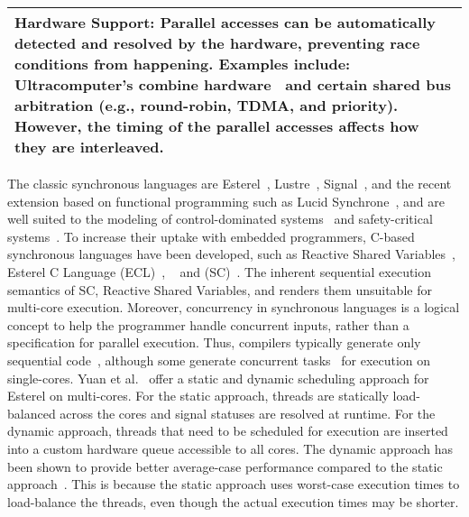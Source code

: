 \begin{table}
{\begin{tabular}{| p{\textwidth} |}
			\textbf{Hardware Support:}
			Parallel accesses can be automatically detected and resolved by the hardware, preventing
			race conditions from happening. Examples include: Ultracomputer's combine hardware~\cite{Schwartz80} 
			and certain shared bus arbitration (e.g., round-robin, TDMA, and priority). However, the 
			timing of the parallel accesses affects how they are interleaved.					\\
			\hline
		\end{tabular}
	}
\end{table}

The classic synchronous languages
are Esterel~\cite{timed_esterel}, Lustre~\cite{timed_lustre}, 
Signal~\cite{timed_signal}, and the recent extension based 
on functional programming such as Lucid Synchrone~\cite{ColacoP03}, 
and are well suited to the modeling 
of control-dominated systems~\cite{CaspiM05} and
safety-critical systems~\cite{timed_synchronous_survey}. 
To increase their uptake with embedded programmers, 
C-based synchronous languages have
been developed, such as Reactive Shared Variables~\cite{timed_reactivec_shared_variables}, 
Esterel C Language (ECL)~\cite{timed_ecl}, \pretc{}~\cite{pret_pretc} and 
\synchronousc{} (SC)~\cite{timed_synccharts_c_proposal,timed_seq_concurrency}. 
The inherent sequential execution semantics of SC, 
Reactive Shared Variables, and \pretc{} renders them 
unsuitable for multi-core execution.
Moreover, concurrency in synchronous languages is a logical concept 
to help the programmer handle concurrent inputs, rather
than a specification for parallel execution.
Thus, compilers typically generate only sequential 
code~\cite{timed_cec,timed_compiling_esterel}, 
although some generate concurrent 
tasks~\cite{CaspiSST08,NataleGZS10,PagettiFBCL11,NataleZ12}
for execution on single-cores. Yuan et al.~\cite{YuanYR11,Yuan13} 
offer a static and dynamic scheduling approach for Esterel
on multi-cores. For the static approach, threads are statically
load-balanced across the cores and signal statuses are resolved 
at runtime. For the dynamic approach, threads that need to be
scheduled for execution are inserted into a custom hardware 
queue accessible to all cores. The dynamic approach has been shown 
to provide better average-case performance compared to the static 
approach~\cite{Yuan13}. This is because the static approach 
uses worst-case execution times to load-balance the threads, even 
though the actual execution times may be shorter.


